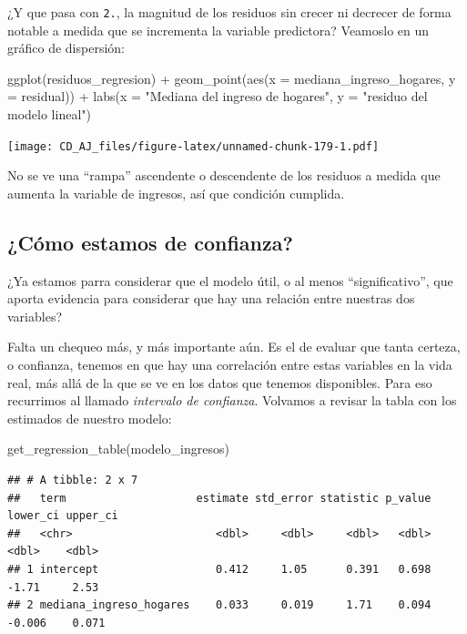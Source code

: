 \documentclass[
]{book}
\newenvironment{Shaded}{\begin{snugshade}}{\end{snugshade}}
\newcommand{\AttributeTok}[1]{\textcolor[rgb]{0.77,0.63,0.00}{#1}}
\newcommand{\FunctionTok}[1]{\textcolor[rgb]{0.00,0.00,0.00}{#1}}
\newcommand{\NormalTok}[1]{#1}
\newcommand{\SpecialCharTok}[1]{\textcolor[rgb]{0.00,0.00,0.00}{#1}}
\newcommand{\StringTok}[1]{\textcolor[rgb]{0.31,0.60,0.02}{#1}}
\begin{document}
¿Y que pasa con \texttt{2.}, la magnitud de los residuos sin crecer ni decrecer de forma notable a medida que se incrementa la variable predictora? Veamoslo en un gráfico de dispersión:

\begin{Shaded}
\begin{Highlighting}[]
\FunctionTok{ggplot}\NormalTok{(residuos\_regresion) }\SpecialCharTok{+}
    \FunctionTok{geom\_point}\NormalTok{(}\FunctionTok{aes}\NormalTok{(}\AttributeTok{x =}\NormalTok{ mediana\_ingreso\_hogares, }\AttributeTok{y =}\NormalTok{ residual)) }\SpecialCharTok{+}
    \FunctionTok{labs}\NormalTok{(}\AttributeTok{x =} \StringTok{"Mediana del ingreso de hogares"}\NormalTok{, }\AttributeTok{y =} \StringTok{"residuo del modelo lineal"}\NormalTok{)}
\end{Highlighting}
\end{Shaded}

\texttt{[image: CD\_AJ\_files/figure-latex/unnamed-chunk-179-1.pdf]}

No se ve una ``rampa'' ascendente o descendente de los residuos a medida que aumenta la variable de ingresos, así que condición cumplida.

\hypertarget{cuxf3mo-estamos-de-confianza}{%
\subsection{¿Cómo estamos de confianza?}\label{cuxf3mo-estamos-de-confianza}}

¿Ya estamos parra considerar que el modelo útil, o al menos ``significativo'', que aporta evidencia para considerar que hay una relación entre nuestras dos variables?

Falta un chequeo más, y más importante aún. Es el de evaluar que tanta certeza, o confianza, tenemos en que hay una correlación entre estas variables en la vida real, más allá de la que se ve en los datos que tenemos disponibles. Para eso recurrimos al llamado \emph{intervalo de confianza}. Volvamos a revisar la tabla con los estimados de nuestro modelo:

\begin{Shaded}
\begin{Highlighting}[]
\FunctionTok{get\_regression\_table}\NormalTok{(modelo\_ingresos)}
\end{Highlighting}
\end{Shaded}

\begin{verbatim}
## # A tibble: 2 x 7
##   term                    estimate std_error statistic p_value lower_ci upper_ci
##   <chr>                      <dbl>     <dbl>     <dbl>   <dbl>    <dbl>    <dbl>
## 1 intercept                  0.412     1.05      0.391   0.698   -1.71     2.53 
## 2 mediana_ingreso_hogares    0.033     0.019     1.71    0.094   -0.006    0.071
\end{verbatim}
\end{document}
